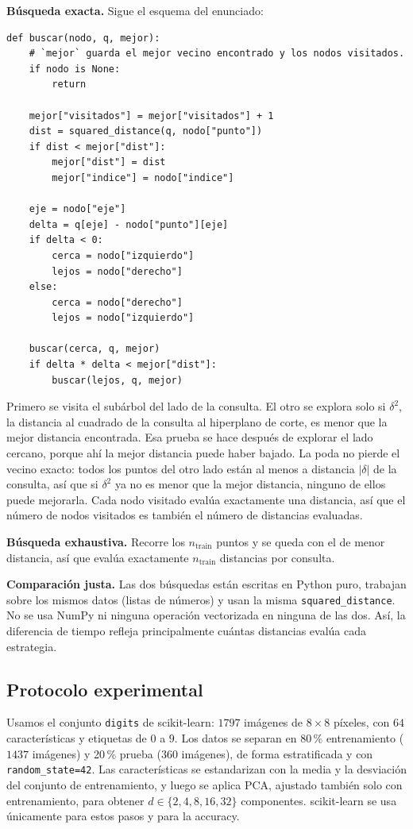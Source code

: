 \textbf{Búsqueda exacta.} Sigue el esquema del enunciado:
\begin{lstlisting}
def buscar(nodo, q, mejor):
    # `mejor` guarda el mejor vecino encontrado y los nodos visitados.
    if nodo is None:
        return

    mejor["visitados"] = mejor["visitados"] + 1
    dist = squared_distance(q, nodo["punto"])
    if dist < mejor["dist"]:
        mejor["dist"] = dist
        mejor["indice"] = nodo["indice"]

    eje = nodo["eje"]
    delta = q[eje] - nodo["punto"][eje]
    if delta < 0:
        cerca = nodo["izquierdo"]
        lejos = nodo["derecho"]
    else:
        cerca = nodo["derecho"]
        lejos = nodo["izquierdo"]

    buscar(cerca, q, mejor)
    if delta * delta < mejor["dist"]:
        buscar(lejos, q, mejor)
\end{lstlisting}
Primero se visita el subárbol del lado de la consulta. El otro se explora solo si
$\delta^2$, la distancia al cuadrado de la consulta al hiperplano de corte, es menor que
la mejor distancia encontrada. Esa prueba se hace después de explorar el lado cercano,
porque ahí la mejor distancia puede haber bajado. La poda no pierde el vecino exacto:
todos los puntos del otro lado están al menos a distancia $|\delta|$ de la consulta, así
que si $\delta^2$ ya no es menor que la mejor distancia, ninguno de ellos puede mejorarla.
Cada nodo visitado evalúa exactamente una distancia, así que el número de nodos visitados
es también el número de distancias evaluadas.

\textbf{Búsqueda exhaustiva.} Recorre los $n_{\text{train}}$ puntos y se queda con el de
menor distancia, así que evalúa exactamente $n_{\text{train}}$ distancias por consulta.

\textbf{Comparación justa.} Las dos búsquedas están escritas en Python puro, trabajan
sobre los mismos datos (listas de números) y usan la misma \texttt{squared\_distance}. No
se usa NumPy ni ninguna operación vectorizada en ninguna de las dos. Así, la diferencia de
tiempo refleja principalmente cuántas distancias evalúa cada estrategia.

\subsection{Protocolo experimental}

Usamos el conjunto \texttt{digits} de scikit-learn: $1797$ imágenes de $8 \times 8$
píxeles, con $64$ características y etiquetas de $0$ a $9$. Los datos se separan en
80\,\% entrenamiento ($1437$ imágenes) y 20\,\% prueba ($360$ imágenes), de forma
estratificada y con \texttt{random\_state=42}. Las características se estandarizan con la
media y la desviación del conjunto de entrenamiento, y luego se aplica PCA, ajustado
también solo con entrenamiento, para obtener $d \in \{2, 4, 8, 16, 32\}$ componentes.
scikit-learn se usa únicamente para estos pasos y para la accuracy.

